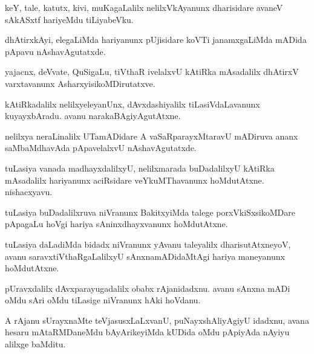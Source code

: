 \begin{mng}
keY, tale, katutx, kivi, muKagaLalilx nelilxVkAyanunx dharisidare avaneV sAkASxtf hariyeMdu tiLiyabeVku.
\end{mng}

\begin{mng}
dhAtirxkAyi, elegaLiMda hariyanunx pUjisidare koVTi janamxgaLiMda mADida pApavu nAshavAgutatxde.
\end{mng}

\begin{mng}
yajacnx, deVvate, QuSigaLu, tiVthaR ivelalxvU kAtiRka mAsadalilx dhAtirxV varxtavanunx AsharxyisikoMDirutatxve.
\end{mng}

\begin{mng}
kAtiRkadalilx nelilxyeleyanUnx, dAvxdashiyalilx tiLasiVdaLavanunx kuyayxbAradu. avanu narakaBAgiyAgutAtxne.
\end{mng}

\begin{mng}
nelilxya neraLinalilx UTamADidare A vaSaRparayxMtaravU mADiruva ananx saMbaMdhavAda pApavelalxvU nAshavAgutatxde.
\end{mng}

\begin{mng}
tuLasiya vanada madhayxdalilxyU, nelilxmarada buDadalilxyU kAtiRka mAsadalilx hariyanunx aciRsidare veYkuMThavanunx hoMdutAtxne. nishacxyavu.
\end{mng}

\begin{mng}
tuLasiya buDadalilxruva niVranunx BakitxyiMda talege porxVkiSxsikoMDare pApagaLu hoVgi hariya sAninxdhayxvanunx hoMdutAtxne.
\end{mng}

\begin{mng}
tuLasiya daLadiMda bidadx niVranunx yAvanu taleyalilx dharisutAtxneyoV, avanu saravxtiVthaRgaLalilxyU sAnxnamADidaMtAgi hariya maneyanunx hoMdutAtxne.
\end{mng}

\begin{mng}
pUravxdalilx dAvxparayugadalilx obabx rAjanidadxnu. avanu sAnxna mADi oMdu sAri oMdu tiLasige niVranunx hAki hoVdanu.
\end{mng}

\begin{mng}
A rAjanu sUrayxnaMte teVjasusxLaLxvanU, puNayxshAliyAgiyU idadxnu, avana hesaru mAtaRMDaneMdu bAyArikeyiMda  kUDida oMdu pApiyAda nAyiyu alilxge baMditu.
\end{mng}

